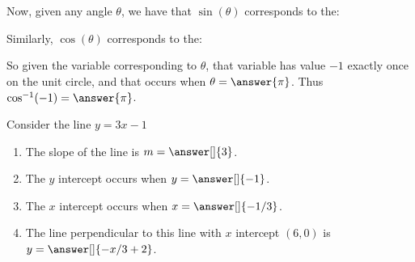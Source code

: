 \documentclass{ximera}
\begin{document}
\begin{question}
\begin{explanation}

Now, given any angle $\theta$, we have that $\sin(\theta)$ corresponds to the:

\begin{multipleChoice}
\end{multipleChoice}
Similarly, $\cos(\theta)$ corresponds to the:
\begin{multipleChoice}
\end{multipleChoice}

So given the variable corresponding to $\theta$, that variable has value $-1$ exactly once on the unit circle, and that occurs when $\theta=\answer{\pi}$.  Thus $\cos^{-1}(-1)=\answer{\pi}$.


\end{explanation}
\end{question}

\begin{question}
Consider the line $y=3x-1$

\begin{enumerate}
\item The slope of the line is $m=\answer[]{3}$.
\item The $y$ intercept occurs when $y=\answer[]{-1}$.
\item The $x$ intercept occurs when $x=\answer[]{-1/3}$.
\item The line perpendicular to this line with $x$ intercept $(6,0)$ is   $y=\answer[]{-x/3+2}$.
\end{enumerate}


\end{question}
\end{document}
